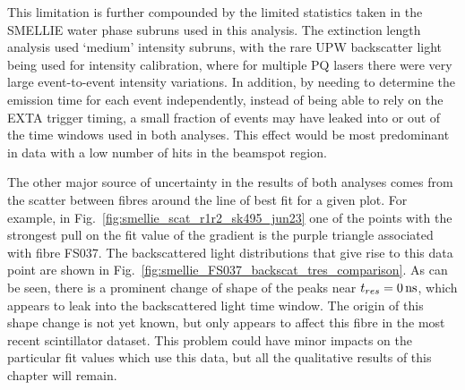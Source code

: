This limitation is further compounded by the limited statistics taken in the SMELLIE water phase subruns used in this analysis. The extinction length analysis used `medium' intensity subruns, with the rare UPW backscatter light being used for intensity calibration, where for multiple PQ lasers there were very large event-to-event intensity variations. In addition, by needing to determine the emission time for each event independently, instead of being able to rely on the EXTA trigger timing, a small fraction of events may have leaked into or out of the time windows used in both analyses. This effect would be most predominant in data with a low number of hits in the beamspot region.

The other major source of uncertainty in the results of both analyses comes from the scatter between fibres around the line of best fit for a given plot. For example, in Fig.~\ref{fig:smellie_scat_r1r2_sk495_jun23} one of the points with the strongest pull on the fit value of the gradient is the purple triangle associated with fibre FS037. The backscattered light distributions that give rise to this data point are shown in Fig.~\ref{fig:smellie_FS037_backscat_tres_comparison}. As can be seen, there is a prominent change of shape of the peaks near $\tres{} = \SI{0}{\ns}$, which appears to leak into the backscattered light time window. The origin of this shape change is not yet known, but only appears to affect this fibre in the most recent scintillator dataset. This problem could have minor impacts on the particular fit values which use this data, but all the qualitative results of this chapter will remain.


